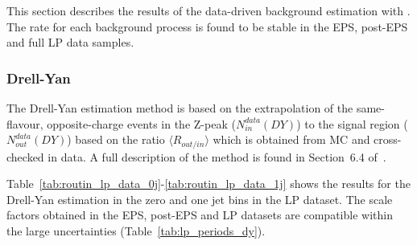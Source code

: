 This section describes the results of the data-driven background estimation with \lpintlumi. 
The rate for each background process is found to be stable in the EPS, post-EPS and full LP data samples.

\subsubsection{Drell-Yan}

The Drell-Yan estimation method is based on the extrapolation of the same-flavour, opposite-charge events in the Z-peak ($N_{in}^{data}(DY)$) 
to the signal region ($N_{out}^{data}(DY)$) based on the ratio $\langle R_{out/in} \rangle$ which is obtained from MC and cross-checked in data.
A full description of the method is found in Section~6.4 of~\cite{epsnote}.

Table~\ref{tab:routin_lp_data_0j}-\ref{tab:routin_lp_data_1j} 
shows the results for the Drell-Yan estimation in the zero and one jet bins in the LP dataset. 
The scale factors obtained in the EPS, post-EPS and LP datasets are compatible within the large uncertainties (Table~\ref{tab:lp_periods_dy}).

